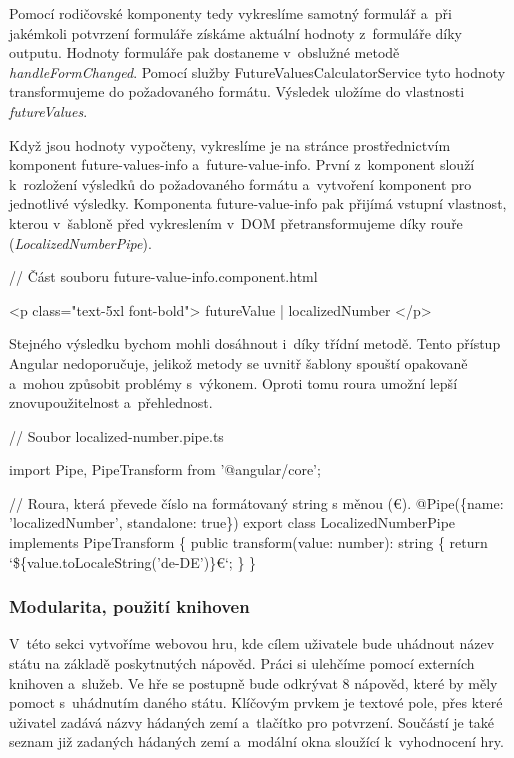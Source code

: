 Pomocí rodičovské komponenty tedy vykreslíme samotný formulář a~při jakémkoli potvrzení formuláře získáme aktuální hodnoty z~formuláře díky outputu. 
Hodnoty formuláře pak dostaneme v~obslužné metodě \emph{handleFormChanged}. Pomocí služby FutureValuesCalculatorService tyto hodnoty transformujeme do požadovaného formátu. 
Výsledek uložíme do vlastnosti \emph{futureValues}.

Když jsou hodnoty vypočteny, vykreslíme je na stránce prostřednictvím komponent future-values-info a~future-value-info. 
První z~komponent slouží k~rozložení výsledků do požadovaného formátu a~vytvoření komponent pro jednotlivé výsledky. 
Komponenta future-value-info pak přijímá vstupní vlastnost, kterou v~šabloně před vykreslením v~DOM přetransformujeme díky rouře (\emph{LocalizedNumberPipe}).

\begin{prog}
// Část souboru future-value-info.component.html

<p class="text-5xl font-bold">{{ futureValue | localizedNumber }}</p>
\end{prog}

Stejného výsledku bychom mohli dosáhnout i~díky třídní metodě. Tento přístup Angular nedoporučuje, jelikož metody se uvnitř šablony spouští opakovaně a~mohou způsobit problémy s~výkonem. 
Oproti tomu roura umožní lepší znovupoužitelnost a~přehlednost.

\begin{prog}
// Soubor localized-number.pipe.ts

import {Pipe, PipeTransform} from '@angular/core';

// Roura, která převede číslo na formátovaný string s měnou (€).
@Pipe(\{name: 'localizedNumber', standalone: true\})
export class LocalizedNumberPipe implements PipeTransform \{
  public transform(value: number): string \{
    return `\$\{value.toLocaleString('de-DE')\}€`;
  \}
\}
\end{prog}

\subsubsection*{Modularita, použití knihoven}

V~této sekci vytvoříme webovou hru, kde cílem uživatele bude uhádnout název státu na základě poskytnutých nápověd. Práci si ulehčíme pomocí externích knihoven a~služeb.
Ve hře se postupně bude odkrývat 8 nápověd, které by měly pomoct s~uhádnutím daného státu. 
Klíčovým prvkem je textové pole, přes které uživatel zadává názvy hádaných zemí a~tlačítko pro potvrzení. 
Součástí je také seznam již zadaných hádaných zemí a~modální okna sloužící k~vyhodnocení hry.

